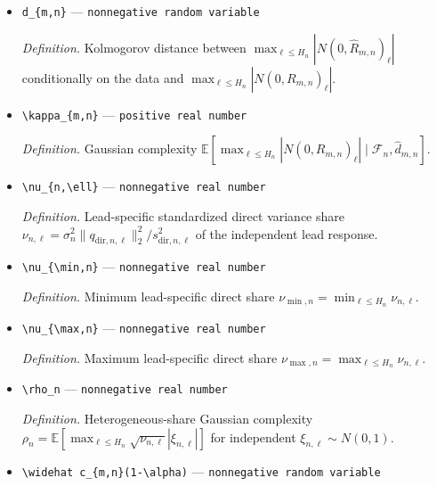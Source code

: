 \documentclass{article}
\begin{document}
\begin{itemize}
  \par\smallskip\noindent\emph{Definition.} Correlation error \(\|\widehat R_{m,n}-R_{m,n}\|_{\max}\).
  \item \texttt{d\_\allowbreak{}\{m,\allowbreak{}n\}\allowbreak{}} --- \texttt{nonnegative random variable}
  \par\smallskip\noindent\emph{Definition.} Kolmogorov distance between \(\max_{\ell\le H_n}|N(0,\widehat R_{m,n})_\ell|\) conditionally on the data and \(\max_{\ell\le H_n}|N(0,R_{m,n})_\ell|\).
  \item \texttt{\textbackslash{}\allowbreak{}kappa\_\allowbreak{}\{m,\allowbreak{}n\}\allowbreak{}} --- \texttt{positive real number}
  \par\smallskip\noindent\emph{Definition.} Gaussian complexity \(\mathbb E[\max_{\ell\le H_n}|N(0,R_{m,n})_\ell|\mid\mathcal F_n,\widehat d_{m,n}]\).
  \item \texttt{\textbackslash{}\allowbreak{}nu\_\allowbreak{}\{n,\allowbreak{}\textbackslash{}\allowbreak{}ell\}\allowbreak{}} --- \texttt{nonnegative real number}
  \par\smallskip\noindent\emph{Definition.} Lead-specific standardized direct variance share \(\nu_{n,\ell}=\sigma_n^2\|q_{\mathrm{dir},n,\ell}\|_2^2/s_{\mathrm{dir},n,\ell}^2\) of the independent lead response.
  \item \texttt{\textbackslash{}\allowbreak{}nu\_\allowbreak{}\{\textbackslash{}\allowbreak{}min,\allowbreak{}n\}\allowbreak{}} --- \texttt{nonnegative real number}
  \par\smallskip\noindent\emph{Definition.} Minimum lead-specific direct share \(\nu_{\min,n}=\min_{\ell\le H_n}\nu_{n,\ell}\).
  \item \texttt{\textbackslash{}\allowbreak{}nu\_\allowbreak{}\{\textbackslash{}\allowbreak{}max,\allowbreak{}n\}\allowbreak{}} --- \texttt{nonnegative real number}
  \par\smallskip\noindent\emph{Definition.} Maximum lead-specific direct share \(\nu_{\max,n}=\max_{\ell\le H_n}\nu_{n,\ell}\).
  \item \texttt{\textbackslash{}\allowbreak{}rho\_\allowbreak{}n} --- \texttt{nonnegative real number}
  \par\smallskip\noindent\emph{Definition.} Heterogeneous-share Gaussian complexity \(\rho_n=\mathbb E[\max_{\ell\le H_n}\sqrt{\nu_{n,\ell}}|\xi_{n,\ell}|]\) for independent \(\xi_{n,\ell}\sim N(0,1)\).
  \item \texttt{\textbackslash{}\allowbreak{}widehat c\_\allowbreak{}\{m,\allowbreak{}n\}\allowbreak{}(1-\allowbreak{}\textbackslash{}\allowbreak{}alpha)} --- \texttt{nonnegative random variable}

\end{itemize}
\end{document}
